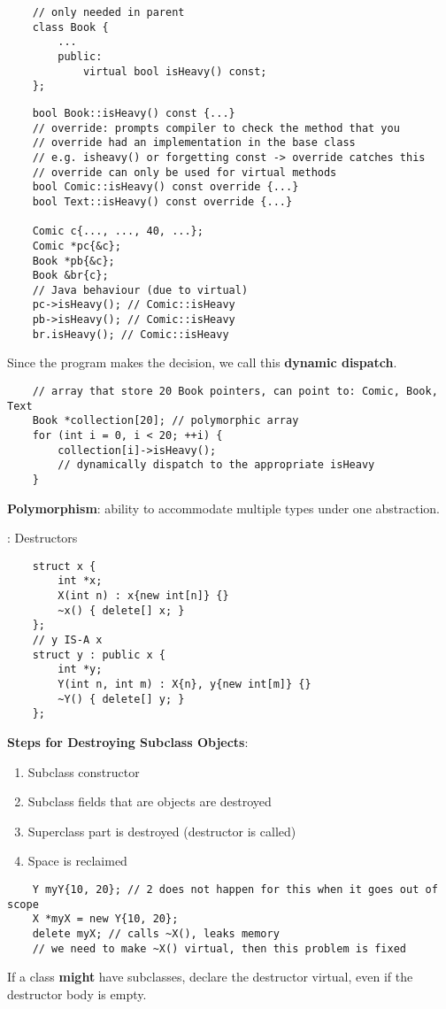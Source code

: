\begin{lstlisting}
    // only needed in parent
    class Book {
        ...
        public:
            virtual bool isHeavy() const;
    };
\end{lstlisting}

\begin{lstlisting}
    bool Book::isHeavy() const {...}
    // override: prompts compiler to check the method that you 
    // override had an implementation in the base class
    // e.g. isheavy() or forgetting const -> override catches this
    // override can only be used for virtual methods
    bool Comic::isHeavy() const override {...}
    bool Text::isHeavy() const override {...}

    Comic c{..., ..., 40, ...};
    Comic *pc{&c};
    Book *pb{&c};
    Book &br{c};
    // Java behaviour (due to virtual)
    pc->isHeavy(); // Comic::isHeavy
    pb->isHeavy(); // Comic::isHeavy
    br.isHeavy(); // Comic::isHeavy
\end{lstlisting}
Since the program makes the decision, we call this \textbf{dynamic dispatch}.

\begin{lstlisting}
    // array that store 20 Book pointers, can point to: Comic, Book, Text
    Book *collection[20]; // polymorphic array
    for (int i = 0, i < 20; ++i) {
        collection[i]->isHeavy();
        // dynamically dispatch to the appropriate isHeavy
    }
\end{lstlisting}
\textbf{Polymorphism}: ability to accommodate multiple types
under one abstraction.

: Destructors
\begin{lstlisting}
    struct x {
        int *x;
        X(int n) : x{new int[n]} {}
        ~x() { delete[] x; }
    };
    // y IS-A x
    struct y : public x {
        int *y;
        Y(int n, int m) : X{n}, y{new int[m]} {}
        ~Y() { delete[] y; }
    };
\end{lstlisting}

\textbf{Steps for Destroying Subclass Objects}:
\begin{enumerate}[(1)]
    \item Subclass constructor
    \item Subclass fields that are objects are destroyed
    \item Superclass part is destroyed (destructor is called)
    \item Space is reclaimed
\end{enumerate}
\begin{lstlisting}
    Y myY{10, 20}; // 2 does not happen for this when it goes out of scope
    X *myX = new Y{10, 20};
    delete myX; // calls ~X(), leaks memory
    // we need to make ~X() virtual, then this problem is fixed
\end{lstlisting}
If a class \textbf{might} have subclasses, declare the destructor virtual,
even if the destructor body is empty.


